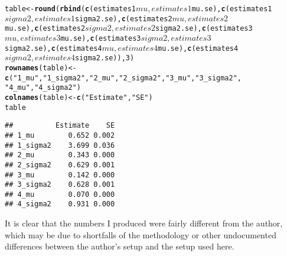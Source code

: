 \documentclass{article}\usepackage{graphicx, color}
\makeatletter
\newcommand{\hlfunctioncall}[1]{\textcolor[rgb]{0.501960784313725,0,0.329411764705882}{\textbf{#1}}}%
\newcommand{\hlstring}[1]{\textcolor[rgb]{0.6,0.6,1}{#1}}%
\newenvironment{kframe}{%
 \def\at@end@of@kframe{}%
 \ifinner\ifhmode%
  \def\at@end@of@kframe{\end{minipage}}%
  \begin{minipage}{\columnwidth}%
 \fi\fi%
 \def\FrameCommand##1{\hskip\@totalleftmargin \hskip-\fboxsep
 \colorbox{shadecolor}{##1}\hskip-\fboxsep
     \hskip-\linewidth \hskip-\@totalleftmargin \hskip\columnwidth}%
 \MakeFramed {\advance\hsize-\width
   \@totalleftmargin\z@ \linewidth\hsize
   \@setminipage}}%
 {\par\unskip\endMakeFramed%
 \at@end@of@kframe}
\newenvironment{knitrout}{}{} %
\makeatother
\begin{document}
\begin{knitrout}
\begin{kframe}
\begin{alltt}
table <- \hlfunctioncall{round}(\hlfunctioncall{rbind}(\hlfunctioncall{c}(estimates1$mu, estimates1$mu.se), \hlfunctioncall{c}(estimates1$sigma2, 
    estimates1$sigma2.se), \hlfunctioncall{c}(estimates2$mu, estimates2$mu.se), \hlfunctioncall{c}(estimates2$sigma2, 
    estimates2$sigma2.se), \hlfunctioncall{c}(estimates3$mu, estimates3$mu.se), \hlfunctioncall{c}(estimates3$sigma2, 
    estimates3$sigma2.se), \hlfunctioncall{c}(estimates4$mu, estimates4$mu.se), \hlfunctioncall{c}(estimates4$sigma2, 
    estimates4$sigma2.se)), 3)
\hlfunctioncall{rownames}(table) <- \hlfunctioncall{c}(\hlstring{"1_mu"}, \hlstring{"1_sigma2"}, \hlstring{"2_mu"}, \hlstring{"2_sigma2"}, \hlstring{"3_mu"}, \hlstring{"3_sigma2"}, 
    \hlstring{"4_mu"}, \hlstring{"4_sigma2"})
\hlfunctioncall{colnames}(table) <- \hlfunctioncall{c}(\hlstring{"Estimate"}, \hlstring{"SE"})
table
\end{alltt}
\begin{verbatim}
##          Estimate    SE
## 1_mu        0.652 0.002
## 1_sigma2    3.699 0.036
## 2_mu        0.343 0.000
## 2_sigma2    0.629 0.001
## 3_mu        0.142 0.000
## 3_sigma2    0.628 0.001
## 4_mu        0.070 0.000
## 4_sigma2    0.931 0.000
\end{verbatim}
\end{kframe}
\end{knitrout}

It is clear that the numbers I produced were fairly different from the author, which may be due to shortfalls of the methodology or other undocumented differences between the author's setup and the setup used here.\\
\end{document}
